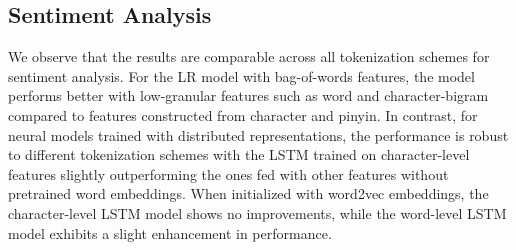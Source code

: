 
\subsection{Sentiment Analysis}

We observe that the results are comparable across all tokenization schemes for sentiment analysis. For the LR model with bag-of-words features, the model performs better with low-granular features such as word and character-bigram compared to features constructed from character and pinyin. In contrast, for neural models trained with distributed representations, the performance is robust to different tokenization schemes with the LSTM trained on character-level features slightly outperforming the ones fed with other features without pretrained word embeddings. When initialized with word2vec embeddings, the character-level LSTM model shows no improvements, while the word-level LSTM model exhibits a slight enhancement in performance.


